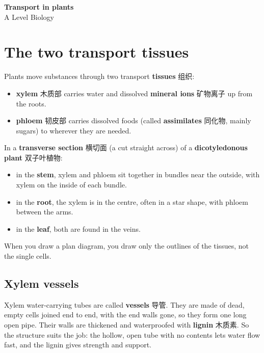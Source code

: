 \documentclass[11pt]{article}
\begin{document}
\begin{center}
  {\LARGE\bfseries Transport in plants}\\[0.35em]
  {\large A Level Biology}
\end{center}
\vspace{0.6em}

\section*{The two transport tissues}

Plants move substances through two transport \textbf{tissues} 组织:

\begin{itemize}
\item \textbf{xylem} 木质部 carries water and dissolved \textbf{mineral ions} 矿物离子 up from the roots.

\item \textbf{phloem} 韧皮部 carries dissolved foods (called \textbf{assimilates} 同化物, mainly sugars) to wherever they are needed.

\end{itemize}

In a \textbf{transverse section} 横切面 (a cut straight across) of a \textbf{dicotyledonous plant} 双子叶植物:

\begin{itemize}
\item in the \textbf{stem}, xylem and phloem sit together in bundles near the outside, with xylem on the inside of each bundle.

\item in the \textbf{root}, the xylem is in the centre, often in a star shape, with phloem between the arms.

\item in the \textbf{leaf}, both are found in the veins.

\end{itemize}

When you draw a plan diagram, you draw only the outlines of the tissues, not the single cells.

\subsection*{Xylem vessels}

Xylem water-carrying tubes are called \textbf{vessels} 导管. They are made of dead, empty cells joined end to end, with the end walls gone, so they form one long open pipe. Their walls are thickened and waterproofed with \textbf{lignin} 木质素. So the structure suits the job: the hollow, open tube with no contents lets water flow fast, and the lignin gives strength and support.
\end{document}
